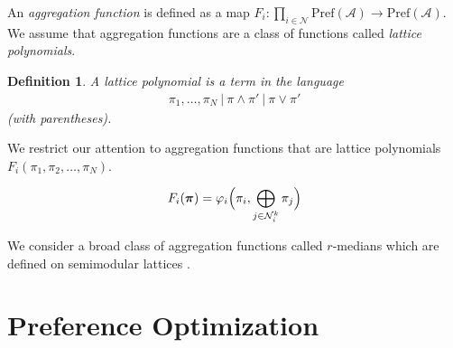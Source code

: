 \documentclass[conference]{ieeeconf}
\newcommand{\N}{\mathcal{N}}
\newcommand{\A}{\mathcal{A}}
\renewcommand{\P}{\mathrm{Pref}}
\newcommand{\join}{\vee}
\newcommand{\meet}{\wedge}
\newtheorem{definition}{Definition}
\newtheorem{axiom}{Axiom}
\begin{document}
An \emph{aggregation function} is defined as a map $F_i: \prod_{i \in \N} \P(\A) \to \P(\A)$. We assume that aggregation functions are a class of functions called \emph{lattice polynomials}.
\begin{definition}
    A \emph{lattice polynomial} is a term in the language
    \begin{align*}
        \pi_1, \dots, \pi_N~\vert~\pi \meet \pi'~\vert~\pi \join \pi'
    \end{align*}
    (with parentheses).
\end{definition}

We restrict our attention to aggregation functions that are lattice polynomials $F_i(\pi_1,\pi_2, \dots, \pi_N)$.

\begin{align}
    F_i(\boldsymbol{\pi}) = \varphi_i \Bigl( \pi_i, \bigoplus_{j \in \N_i^k} \pi_j \Bigr)
\end{align}


We consider a broad class of aggregation functions called $r$-medians which are defined on semimodular lattices \cite{leclerc}.






\section{Preference Optimization}




\appendix
\end{document}
